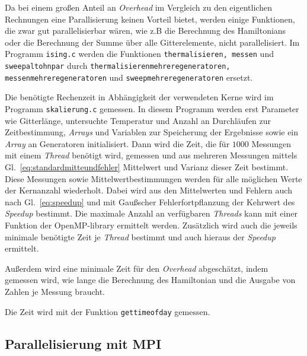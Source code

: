 	
	Da bei einem großen Anteil an \textit{Overhead} im Vergleich zu den eigentlichen Rechnungen eine Parallisierung keinen Vorteil bietet, werden einige Funktionen, die zwar gut parallelisierbar wären, wie z.B die Berechnung des Hamiltonians oder die Berechnung der Summe über alle Gitterelemente, nicht parallelisiert. Im Programm \texttt{ising.c} werden die Funktionen \texttt{thermalisieren, messen} und \texttt{sweepaltohnpar} durch \texttt{thermalisierenmehreregeneratoren, messenmehreregeneratoren} und \texttt{sweepmehreregeneratoren} ersetzt.
	
	Die benötigte Rechenzeit in Abhängigkeit der verwendeten Kerne wird im Programm \texttt{skalierung.c} gemessen. In diesem Programm werden erst Parameter wie Gitterlänge, untersuchte Temperatur und Anzahl an Durchläufen zur Zeitbestimmung, \textit{Arrays} und Variablen zur Speicherung der Ergebnisse sowie ein \textit{Array} an Generatoren initialisiert. Dann wird die Zeit, die für $\num{1000}$ Messungen mit einem \textit{Thread} benötigt wird, gemessen und aus mehreren Messungen mittels Gl.~\ref{eq:standardmitteundfehler} Mittelwert und Varianz dieser Zeit bestimmt. Diese Messungen sowie Mittelwertbestimmungen werden für alle möglichen Werte der Kernanzahl wiederholt. Dabei wird aus den Mittelwerten und Fehlern auch nach Gl.~\ref{eq:speedup} und mit Gaußscher Fehlerfortpflanzung der Kehrwert des \textit{Speedup} bestimmt. Die maximale Anzahl an verfügbaren \textit{Threads} kann mit einer Funktion der OpenMP-library ermittelt werden. 
	Zusätzlich wird auch die jeweils minimale benötigte Zeit je \textit{Thread} bestimmt und auch hieraus der \textit{Speedup} ermittelt.
	
	Außerdem wird eine minimale Zeit für den \textit{Overhead} abgeschätzt, indem gemessen wird, wie lange die Berechnung des Hamiltonian und die Ausgabe von Zahlen je Messung braucht. 
	
	Die Zeit wird mit der Funktion \texttt{gettimeofday} gemessen.
	
	\subsection{Parallelisierung mit MPI}
	\label{subsec:parmpi}
	

